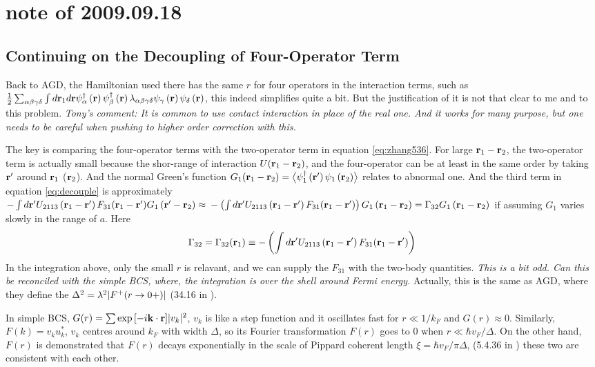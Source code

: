 \section{note of 2009.09.18}
\subsection{Continuing on the Decoupling of Four-Operator Term}
Back to AGD\cite{Abrikosov}, the Hamiltonian used there has the same $r$ for four operators in the interaction terms, such as $\frac{1}{2}\sum_{\alpha\beta\gamma\delta}\int{d}\mathbf{r}_1{d}\mathbf{r}\psi^\dagger_\alpha\left(\mathbf{r}\right)\psi^\dagger_\beta\left(\mathbf{r}\right)\lambda_{\alpha\beta\gamma\delta}\psi_\gamma\left(\mathbf{r}\right)\psi_\delta\left(\mathbf{r}\right)$, this indeed simplifies quite a bit.  But the justification of it is not that clear to me and to this problem.  
\emph{Tony's comment:  It is common to use contact interaction in place of the real one. And it works for many purpose, but one needs to be careful when pushing to higher order correction with this. }

The key is comparing the four-operator terms with the two-operator term in equation \eqref{eq:zhang536}.  For large $\mathbf{r}_1-\mathbf{r}_2$, the two-operator term is actually small because the shor-range of interaction $U(\mathbf{r}_1-\mathbf{r}_2)$, and the four-operator can be at least in the same order by taking $\mathbf{r}'$ around $\mathbf{r}_1$ ($\mathbf{r}_2$). And the normal Green's function $G_{1}(\mathbf{r}_1-\mathbf{r}_2)=\bigl<{\psi^\dagger_{1}\left(\mathbf{r}'\right)\psi_1\left(\mathbf{r}_2\right)}\bigr>$ relates to abnormal one.  And the third term in equation \eqref{eq:decouple} is approximately $-\int{d}\mathbf{r}'U_{2113}\left(\mathbf{r}_1-\mathbf{r}'\right)F_{31}(\mathbf{r}_1-\mathbf{r}')G_{1}\left(\mathbf{r}'-\mathbf{r}_2\right)\approx{}-\left(\int{d}\mathbf{r}'U_{2113}\left(\mathbf{r}_1-\mathbf{r}'\right)F_{31}(\mathbf{r}_1-\mathbf{r}')\right)G_{1}\left(\mathbf{r}_1-\mathbf{r}_2\right)=\Gamma_{32}G_{1}\left(\mathbf{r}_1-\mathbf{r}_2\right)$ if  assuming $G_{1}$ varies slowly in the range of $a$. Here 
\begin{equation}
\Gamma_{32}=\Gamma_{32}(\mathbf{r}_1)\equiv-\left(\int{d}\mathbf{r}'U_{2113}\left(\mathbf{r}_1-\mathbf{r}'\right)F_{31}(\mathbf{r}_1-\mathbf{r}')\right)
\end{equation}
In the integration above, only the small $r$ is relavant, and we can supply the $F_{31}$ with the two-body quantities. 
\emph{This is a bit odd. Can this be reconciled with the simple BCS, where, the integration is over the shell around Fermi energy. } Actually, this is the same as AGD, where they define the $\Delta^2=\lambda^2\lvert{F^+(r\rightarrow0+)}\rvert$ (34.16 in \cite{Abrikosov}). 

In simple BCS, $G(r)=\sum{\exp\ensuremath{\left[-i\mathbf{k}\cdot\mathbf{r}\right]}}\lvert{v_k}\rvert^2$, $v_k$ is like a step function and it oscillates fast for $r\ll{1/k_F}$ and $G(r)\approx0$.  Similarly, $F(k)=v_ku^*_k$, $v_k$ centres around $k_F$ with width $\Delta$, so its Fourier transformation $F(r)$ goes to 0 when $r\ll{\hbar{v_F}/\Delta}$.  On the other hand, $F(r)$ is demonstrated that $F(r)$ decays exponentially in the scale of Pippard coherent length $\xi={\hbar{v_F}/\pi\Delta}$, (5.4.36 in \cite{Leggett}) these two are consistent with each other.  


